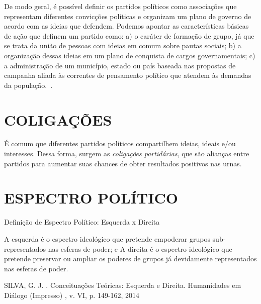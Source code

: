 De modo geral, é possível definir os partidos políticos como associações que representam diferentes convicções políticas e organizam um plano de governo de acordo com as ideias que defendem. Podemos apontar as características básicas de ação que definem um partido como: a) o caráter de formação de grupo, já que se trata da união de pessoas com ideias em comum sobre pautas sociais; b) a organização dessas ideias em um plano de conquista de cargos governamentais; c) a administração de um município, estado ou país baseada nas propostas de campanha aliada às correntes de pensamento político que atendem às demandas da população.~\cite{garibaldi2017partidos}.


\section{\texorpdfstring{\MakeUppercase{Coligações}}{}}
\label{conceitos__coligacoes}

É comum que diferentes partidos políticos compartilhem ideias, ideais e/ou interesses. Dessa forma, surgem as \emph{coligações partidárias}, que são alianças entre partidos para aumentar suas chances de obter resultados positivos nas urnas.



\section{\texorpdfstring{\MakeUppercase{Espectro Político}}{}}
\label{conceitos__espectro-politico}

Definição de Espectro Político: Esquerda x Direita

A esquerda é o espectro ideológico que pretende empoderar grupos sub-representados nas esferas de
poder; e
A direita é o espectro ideológico que pretende preservar ou ampliar os poderes de grupos já devidamente
representados nas esferas de poder.

SILVA, G. J. . Conceituações Teóricas: Esquerda e Direita. Humanidades em Diálogo (Impresso) , v. VI, p. 149-162, 2014



